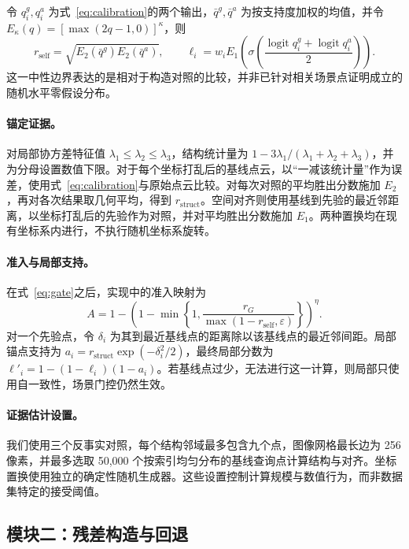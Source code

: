 \documentclass{article}
\newcommand{\rself}{r_{\mathrm{self}}}
\newcommand{\rstruct}{r_{\mathrm{struct}}}
\DeclareMathOperator{\logit}{logit}
\begin{document}
令 $q_i^g,q_i^a$ 为式~\eqref{eq:calibration}的两个输出，$\bar q^g,\bar q^a$ 为按支持度加权的均值，并令 $E_\kappa(q)=[\max(2q-1,0)]^\kappa$，则
\begin{equation}
\rself=\sqrt{E_2(\bar q^g)E_2(\bar q^a)},\qquad
\ell_i=w_i E_1\!\left(
\sigma\!\left(\frac{\logit q_i^g+\logit q_i^a}{2}\right)\right).
\label{eq:local}
\end{equation}
这一中性边界表达的是相对于构造对照的比较，并非已针对相关场景点证明成立的随机水平零假设分布。

\paragraph{锚定证据。}
对局部协方差特征值 $\lambda_1\le\lambda_2\le\lambda_3$，结构统计量为 $1-3\lambda_1/(\lambda_1+\lambda_2+\lambda_3)$，并为分母设置数值下限。对于每个坐标打乱后的基线点云，以“一减该统计量”作为误差，使用式~\eqref{eq:calibration}与原始点云比较。对每次对照的平均胜出分数施加 $E_2$，再对各次结果取几何平均，得到 $\rstruct$。空间对齐则使用基线到先验的最近邻距离，以坐标打乱后的先验作为对照，并对平均胜出分数施加 $E_1$。两种置换均在现有坐标系内进行，不执行随机坐标系旋转。

\paragraph{准入与局部支持。}
在式~\eqref{eq:gate}之后，实现中的准入映射为
\begin{equation}
A=1-\left(1-\min\left\{1,
\frac{r_G}{\max(1-\rself,\varepsilon)}\right\}\right)^\eta.
\label{eq:admission}
\end{equation}
对一个先验点，令 $\delta_i$ 为其到最近基线点的距离除以该基线点的最近邻间距。局部锚点支持为 $a_i=\rstruct\exp(-\delta_i^2/2)$，最终局部分数为 $\ell'_i=1-(1-\ell_i)(1-a_i)$。若基线点过少，无法进行这一计算，则局部只使用自一致性，场景门控仍然生效。

\paragraph{证据估计设置。}
我们使用三个反事实对照，每个结构邻域最多包含九个点，图像网格最长边为 256 像素，并最多选取 50,000 个按索引均匀分布的基线查询点计算结构与对齐。坐标置换使用独立的确定性随机生成器。这些设置控制计算规模与数值行为，而非数据集特定的接受阈值。

\subsection{模块二：残差构造与回退}
\label{app:initialization}
\end{document}
